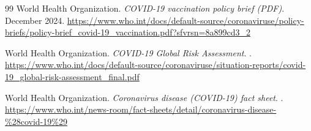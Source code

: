 \documentclass[12pt]{article}
\begin{document}
\begin{thebibliography}{99}
World Health Organization.
\newblock \emph{COVID-19 vaccination policy brief (PDF)}.
\newblock December 2024.
\newblock \url{https://www.who.int/docs/default-source/coronaviruse/policy-briefs/policy-brief_covid-19_vaccination.pdf?sfvrsn=8a899cd3_2}

World Health Organization.
\newblock \emph{COVID-19 Global Risk Assessment}.
.
\newblock \url{https://www.who.int/docs/default-source/coronaviruse/situation-reports/covid-19_global-risk-assessment_final.pdf}

World Health Organization.
\newblock \emph{Coronavirus disease (COVID-19) fact sheet}.
.
\newblock \url{https://www.who.int/news-room/fact-sheets/detail/coronavirus-disease-%28covid-19%29}

\end{thebibliography}
\end{document}
